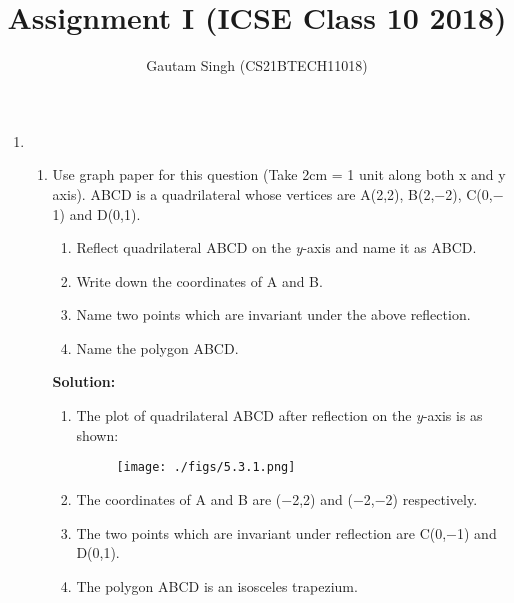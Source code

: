 \documentclass[journal,12pt,twocolumn]{IEEEtran}
\newcommand{\solution}{\noindent \textbf{Solution: }}
\begin{document}
\vspace{3cm}
\title{Assignment I (ICSE Class 10 2018)}
\author{Gautam Singh (CS21BTECH11018)}
\maketitle
\begin{enumerate}[label=\arabic{enumi}. , start = 5]
\item
\begin{enumerate}[label=\alph{enumii}. , start = 3]
\item Use graph paper for this question (Take 2cm = 1 unit along both x and y axis). ABCD is a quadrilateral whose vertices are A(2,2), B(2,$-$2), C(0,$-$1) and D(0,1).
\begin{enumerate}[label=(\roman{enumiii})]
\item Reflect quadrilateral ABCD on the \textit{y}-axis and name it as A\textquotesingle B\textquotesingle CD.
\item Write down the coordinates of A{\textquotesingle} and B\textquotesingle .
\item Name two points which are invariant under the above reflection.
\item Name the polygon A\textquotesingle B\textquotesingle CD.
\end{enumerate}
\solution 
\begin{enumerate}[label=(\roman{enumiii})]
\item The plot of quadrilateral ABCD after reflection on the \textit{y}-axis is as shown:
\begin{figure}[h]
\centering
\texttt{[image: ./figs/5.3.1.png]}
\end{figure}
\item The coordinates of A{\textquotesingle} and B{\textquotesingle} are ($-$2,2) and ($-$2,$-$2) respectively.
\item The two points which are invariant under reflection are C(0,$-$1) and D(0,1).
\item The polygon A\textquotesingle B\textquotesingle CD is an isosceles trapezium.
\end{enumerate}
\end{enumerate}
\end{enumerate}
\end{document}
